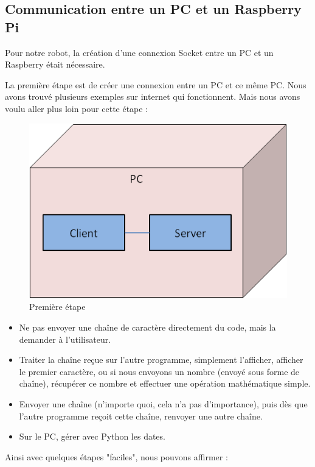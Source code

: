 \documentclass[12pt,a4paper]{report}
\begin{document}
\subsection{Communication entre un PC et un Raspberry Pi}

Pour notre robot, la création d'une connexion Socket entre un PC et un Raspberry était nécessaire.

La première étape est de créer une connexion entre un PC et ce même PC. Nous avons trouvé plusieurs exemples sur internet qui fonctionnent. Mais nous avons voulu aller plus loin pour cette étape : 

\begin{figure}[hf!]
\center
\includegraphics[scale=0.6]{images/Socket1.png}
\caption{Première étape}
\end{figure}

\begin{itemize}
\item Ne pas envoyer une chaîne de caractère directement du code, mais la demander à l'utilisateur.
\item Traiter la chaîne reçue sur l'autre programme, simplement l'afficher, afficher le premier caractère, ou si nous envoyons un nombre (envoyé sous forme de chaîne), récupérer ce nombre et effectuer une opération mathématique simple.
\item Envoyer une chaîne (n'importe quoi, cela n'a pas d'importance), puis dès que l'autre programme reçoit cette chaîne, renvoyer une autre chaîne.
\item Sur le PC, gérer avec Python les dates.
\end{itemize}

\bigbreak

Ainsi avec quelques étapes "faciles", nous pouvons affirmer :
\end{document}
